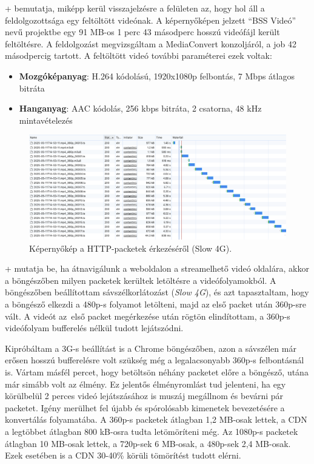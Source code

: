 \Az+ bemutatja, miképp kerül visszajelzésre a felületen az, hogy hol áll a feldolgozottsága egy feltöltött videónak. A képernyőképen jelzett ``BSS Videó'' nevű projektbe egy 91 MB-os 1 perc 43 másodperc hosszú videófájl került feltöltésre. A feldolgozást megvizsgáltam a MediaConvert konzoljáról, a job 42 másodpercig tartott. A feltöltött videó további paraméterei ezek voltak:

\begin{itemize}
  \setlength{\itemsep}{1pt}
  \setlength{\parskip}{0pt}
  \setlength{\parsep}{0pt}
  \item \textbf{Mozgóképanyag}: H.264 kódolású, 1920x1080p felbontás, 7 Mbps átlagos bitráta
  \item \textbf{Hanganyag}: AAC kódolás, 256 kbps bitráta, 2 csatorna, 48 kHz mintavételezés
\end{itemize}

\begin{figure}[h]
  \centering
  \includegraphics[width=150mm, keepaspectratio]{figures/browser_slow4g.png}
  \caption{Képernyőkép a HTTP-packetek érkezéséről (Slow 4G).}
  \label{fig:slow4g}
\end{figure}

\Az+ mutatja be, ha átnavigálunk a weboldalon a streamelhető videó oldalára, akkor a böngészőben milyen packetek kerültek letöltésre a videófolyamokból. A böngészőben beállítottam sávszélkorlátozást (\emph{Slow 4G}), és azt tapasztaltam, hogy a böngésző elkezdi a 480p-s folyamot letölteni, majd az első packet után 360p-sre vált. A videót az~első packet megérkezése után rögtön elindítottam, a 360p-s videófolyam bufferelés nélkül tudott lejátszódni.

Kipróbáltam a 3G-s beállítást is a Chrome böngészőben, azon a sávszélen már erősen hosszú bufferelésre volt szükség még a legalacsonyabb 360p-s felbontásnál is. Vártam másfél percet, hogy betöltsön néhány packetet előre a böngésző, utána már simább volt az élmény. Ez jelentős élményromlást tud jelenteni, ha egy körülbelül 2 perces videó lejátszásához is muszáj megállnom és bevárni pár packetet. Igény merülhet fel újabb és spórolósabb kimenetek bevezetésére a konvertálás folyamatába.
A 360p-s packetek átlagban 1,2 MB-osak lettek, a CDN a legtöbbet átlagban 800 kB-osra tudta letömöríteni még. Az 1080p-s packetek átlagban 10 MB-osak lettek, a 720p-sek 6 MB-osak, a 480p-sek 2,4 MB-osak. Ezek esetében is a CDN 30-40\% körüli tömörítést tudott elérni.

